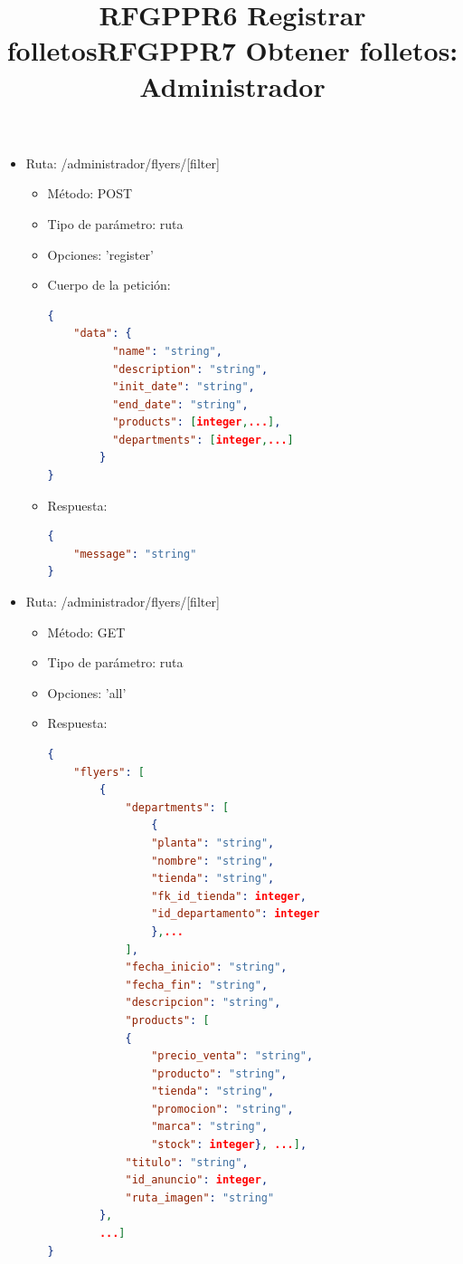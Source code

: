 

\title{\textbf{RFGPPR6 Registrar folletos}}
\begin{itemize}
\item Ruta: /administrador/flyers/[filter]
\begin{itemize}
\item Método: POST
\item Tipo de parámetro: ruta
\item Opciones: 'register'
\item Cuerpo de la petición:
\begin{lstlisting}[language=json,firstnumber=1]
{
	"data": {
          "name": "string",
          "description": "string",
          "init_date": "string",
          "end_date": "string",
          "products": [integer,...],
          "departments": [integer,...]
        }
}
\end{lstlisting}
\item Respuesta: 
\begin{lstlisting}[language=json,firstnumber=1]
{
    "message": "string"
}
\end{lstlisting}
\end{itemize}
\end{itemize}

\title{\textbf{RFGPPR7 Obtener folletos: Administrador}} %
\begin{itemize}
\item Ruta: /administrador/flyers/[filter]
\begin{itemize}
\item Método: GET
\item Tipo de parámetro: ruta
\item Opciones: 'all'
\item Respuesta: 
\begin{lstlisting}[language=json,firstnumber=1]
{
    "flyers": [
        {
            "departments": [
				{
				"planta": "string",
                "nombre": "string",
                "tienda": "string",
                "fk_id_tienda": integer,
                "id_departamento": integer
				},...
            ],
            "fecha_inicio": "string",
            "fecha_fin": "string",
            "descripcion": "string",
            "products": [
            {
            	"precio_venta": "string",
                "producto": "string",
                "tienda": "string",
                "promocion": "string",
                "marca": "string",
                "stock": integer}, ...],
            "titulo": "string",
            "id_anuncio": integer,
            "ruta_imagen": "string"
        },
        ...]
}
\end{lstlisting}
\end{itemize}
\end{itemize}


